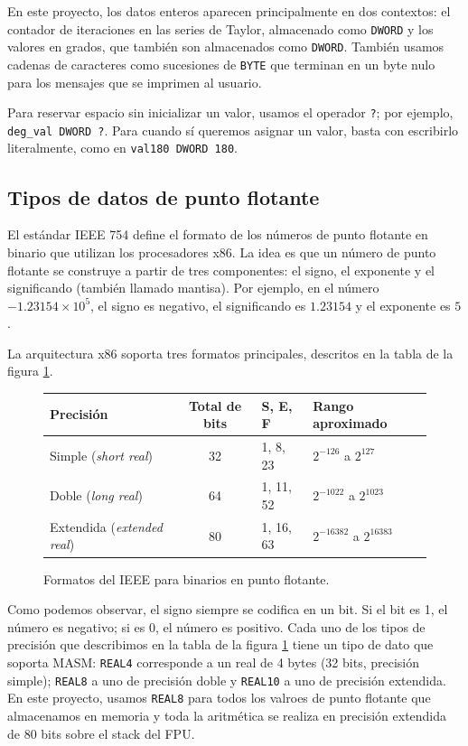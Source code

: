 \documentclass[12pt]{article}
\begin{document}
En este proyecto, los datos enteros aparecen principalmente en dos contextos:
el contador de iteraciones en las series de Taylor, almacenado como
\texttt{DWORD} y los valores en grados, que también son almacenados como
\texttt{DWORD}. También usamos cadenas de caracteres como sucesiones de
\texttt{BYTE} que terminan en un byte nulo para los mensajes que se imprimen al
usuario.

Para reservar espacio sin inicializar un valor, usamos el operador \texttt{?};
por ejemplo, \texttt{deg\_val DWORD ?}. Para cuando sí queremos asignar un
valor, basta con escribirlo literalmente, como en \texttt{val180 DWORD 180}.

\subsection{Tipos de datos de punto flotante}

El estándar IEEE 754 define el formato de los números de punto flotante en
binario que utilizan los procesadores x86. La idea es que un número de punto
flotante se construye a partir de tres componentes: el signo, el exponente y el
significando (también llamado mantisa). Por ejemplo, en el número $-1.23154
\times 10^5$, el signo es negativo, el significando es $1.23154$ y el exponente
es $5$ \parencite{IrvineBook}.

La arquitectura x86 soporta tres formatos principales, descritos en la tabla de
la figura \ref{tabla-flotantes}.
\begin{figure}[ht]
\centering
  \begin{tabular}{l c l l}
    Precisión & Total de bits & S, E, F & Rango aproximado \\
    \hline \hline
    Simple (\textit{short real}) & 32 & 1, 8, 23 & $2^{-126}$ a $2^{127}$ \\ \hline
    Doble (\textit{long real}) & 64 & 1, 11, 52 & $2^{-1022}$ a $2^{1023}$ \\ \hline
    Extendida (\textit{extended real}) & 80 & 1, 16, 63 & $2^{-16382}$ a $2^{16383}$ \\
  \end{tabular}
\caption{Formatos del IEEE para binarios en punto flotante.}
\label{tabla-flotantes}
\end{figure}

Como podemos observar, el signo siempre se codifica en un bit. Si el bit es 1,
el número es negativo; si es 0, el número es positivo. Cada uno de los tipos de
precisión que describimos en la tabla de la figura \ref{tabla-flotantes} tiene
un tipo de dato que soporta MASM: \texttt{REAL4} corresponde a un real de 4
bytes (32 bits, precisión simple); \texttt{REAL8} a uno de precisión doble y
\texttt{REAL10} a uno de precisión extendida. En este proyecto, usamos
\texttt{REAL8} para todos los valroes de punto flotante que almacenamos en
memoria y toda la aritmética se realiza en precisión extendida de 80 bits sobre
el stack del FPU.
\end{document}
